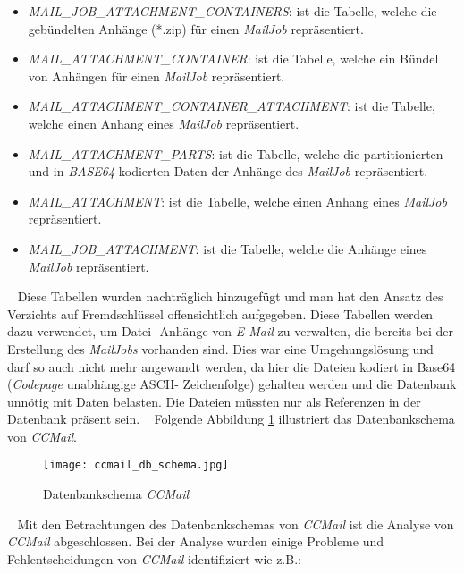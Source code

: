 \begin{itemize}
	\item\emph{MAIL\_JOB\_ATTACHMENT\_CONTAINERS}:
	\newline
	ist die Tabelle, welche die gebündelten Anhänge (*.zip) für einen \emph{MailJob} repräsentiert.
	\item\emph{MAIL\_ATTACHMENT\_CONTAINER}:
	\newline
	ist die Tabelle, welche ein Bündel von Anhängen für einen \emph{MailJob} repräsentiert.
	\item\emph{MAIL\_ATTACHMENT\_CONTAINER\_ATTACHMENT}:
	\newline
	ist die Tabelle, welche einen Anhang eines \emph{MailJob} repräsentiert.
	\item\emph{MAIL\_ATTACHMENT\_PARTS}:
	\newline
	ist die Tabelle, welche die partitionierten und in \emph{BASE64} kodierten Daten der Anhänge des \emph{MailJob} repräsentiert.
	\item\emph{MAIL\_ATTACHMENT}:
	\newline
	ist die Tabelle, welche einen Anhang eines \emph{MailJob} repräsentiert. 
	\item\emph{MAIL\_JOB\_ATTACHMENT}:
	\newline
	ist die Tabelle, welche die Anhänge eines \emph{MailJob} repräsentiert.
\end{itemize}
\ \newline
Diese Tabellen wurden nachträglich hinzugefügt und man hat den Ansatz des Verzichts auf Fremdschlüssel offensichtlich aufgegeben. Diese Tabellen werden dazu verwendet, um Datei- Anhänge von \emph{E-Mail} zu verwalten, die bereits bei der Erstellung des \emph{MailJobs} vorhanden sind. Dies war eine Umgehungslösung und darf so auch nicht mehr angewandt werden, da hier die Dateien kodiert in Base64 (\emph{Codepage} unabhängige ASCII- Zeichenfolge) gehalten werden und die Datenbank unnötig mit Daten belasten. Die Dateien müssten nur als Referenzen in der Datenbank präsent sein.
\ \newpage
Folgende Abbildung \ref{fig:ccmail-db-schema} illustriert das Datenbankschema von \emph{CCMail}.
\begin{figure}[H]
\centering
\texttt{[image: ccmail\_db\_schema.jpg]} 
\caption{Datenbankschema \emph{CCMail}}
\label{fig:ccmail-db-schema}
\end{figure}
\ \newline
Mit den Betrachtungen des Datenbankschemas von \emph{CCMail} ist die Analyse von \emph{CCMail} abgeschlossen. Bei der Analyse wurden einige Probleme und Fehlentscheidungen von \emph{CCMail} identifiziert wie z.B.:
